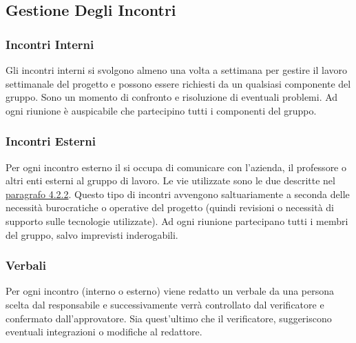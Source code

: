 		\subsection{Gestione Degli Incontri}
		\subsubsection{Incontri Interni}
		Gli incontri interni si svolgono almeno una volta a settimana per gestire il lavoro settimanale del progetto e possono essere richiesti da un qualsiasi componente del gruppo. Sono un momento di confronto e risoluzione di eventuali problemi. Ad ogni riunione è auspicabile che partecipino tutti i componenti del gruppo.
		\subsubsection{Incontri Esterni}
		Per ogni incontro esterno il \RdP{} si occupa di comunicare con l'azienda, il professore o altri enti esterni al gruppo di lavoro. 
		Le vie utilizzate sono le due descritte nel \hyperref[sec:Comunicazioni Esterne]{paragrafo 4.2.2}.
		Questo tipo di incontri avvengono saltuariamente a seconda delle necessità burocratiche o operative del progetto (quindi revisioni o necessità di supporto sulle tecnologie utilizzate).
		Ad ogni riunione partecipano tutti i membri del gruppo, salvo imprevisti inderogabili.
		\subsubsection{Verbali}
		Per ogni incontro (interno o esterno) viene redatto un verbale da una persona scelta dal responsabile e successivamente verrà controllato dal verificatore e confermato dall’approvatore. Sia quest'ultimo che il verificatore, suggeriscono eventuali integrazioni o modifiche al redattore.
		

